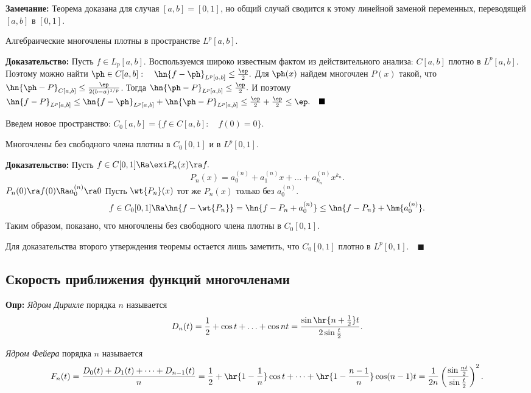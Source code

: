 \documentclass[a4paper]{article}
\begin{document}
\noindent\textbf{Замечание:} Теорема доказана для случая
$[a,b]=[0,1]$, но общий случай сводится к этому линейной заменой
переменных, переводящей $[a,b]$ в $[0,1]$.

\begin{theorem} Алгебраические многочлены плотны в
пространстве $L^p[a,b]$.
\end{theorem}
\textbf{Доказательство:} Пусть $f\in L_p[a,b]$. Воспользуемся
широко известным фактом из действительного анализа: $C[a,b]$
плотно в $L^p[a,b]$. Поэтому можно найти $\ph\in C[a,b]:\quad
\hn{f-\ph}_{L^p[a,b]}\le\frac{\ep}{2}.$ Для $\ph(x)$
найдем многочлен $P(x)$ такой, что
$\hn{\ph-P}_{C[a,b]}\le\frac{\ep}{2(b-a)^{1/p}}$. Тогда
$\hn{\ph-P}_{L^p[a,b]}\le\frac{\ep}2.$ И поэтому
$\hn{f-P}_{L^p[a,b]}\le\hn{f-\ph}_{L^p[a,b]}+\hn{\ph-P}_{L^p[a,b]}\le\frac{\ep}2+\frac{\ep}2\le\ep.\quad\blacksquare$

\medskip Введем новое пространство: $C_0[a,b]=\{f\in C[a,b]:\quad f(0)=0\}$.

\begin{theorem}
Многочлены без свободного члена плотны в $C_0[0,1]$ и в
$L^p[0,1]$.
\end{theorem}
\textbf{Доказательство:} Пусть $f\in C[0,1]\Ra\exi
P_n(x)\ra f.$
$$P_n(x)=a_0^{(n)}+a_1^{(n)}x+\ldots+a_{k_n}^{(n)}x^{k_n}.$$
$P_n(0)\ra f(0)\Ra a_0^{(n)}\ra 0$ Пусть
$\wt{P_n}(x)$ тот же $P_n(x)$ только без $a_0^{(n)}$.
$$f\in
C_0[0,1]\Ra\hn{f-\wt{P_n}}=\hn{f-P_n+a_0^{(n)}}\le\hn{f-P_n}+\hm{a_0^{(n)}}.$$
Таким образом, показано, что многочлены без свободного члена
плотны в $C_0[0,1].$

Для доказательства второго утверждения теоремы остается лишь
заметить, что $C_0[0,1]$ плотно в $L^p[0,1].\quad\blacksquare$

\subsection{Скорость приближения функций многочленами}
\textbf{Опр:} \emph{Ядром Дирихле} порядка $n$ называется
$$D_n(t)=\frac12+\cos t+\ldots+\cos nt=\frac{\sin\hr{n+\frac12}t}{2\sin \frac t2}.$$

\begin{df}
  \emph{Ядром Фейера} порядка $n$ называется
  \begin{multline*}
    F_n(t)=\frac{D_0(t)+D_1(t)+\dots+D_{n-1}(t)}{n}=\frac12+\hr{1-\frac1n}\cos
    t+\dots+\hr{1-\frac{n-1}{n}}\cos
    (n-1)t=\frac1{2n}\left(\frac{\sin \frac{nt}2}{\sin\frac t2}\right)^2.
  \end{multline*}
\end{df}
\end{document}
